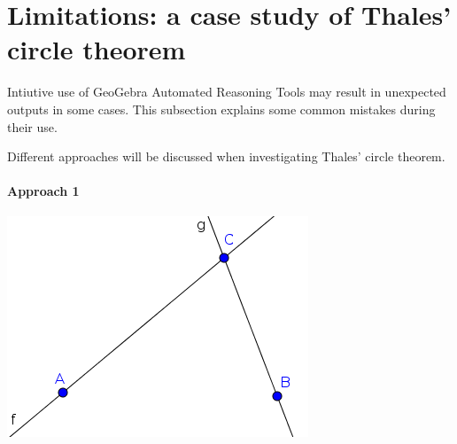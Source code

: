 \documentclass{article}
\begin{document}
\section{Limitations: a case study of Thales' circle theorem}

Intiutive use of GeoGebra Automated Reasoning Tools may result in unexpected outputs in some cases. This subsection explains some common mistakes during their use.

Different approaches will be discussed when investigating Thales' circle theorem.

\paragraph{Approach 1}
\begin{center}
\includegraphics[scale=0.5]{limitations-Thales1-1}
\end{center}
\end{document}
